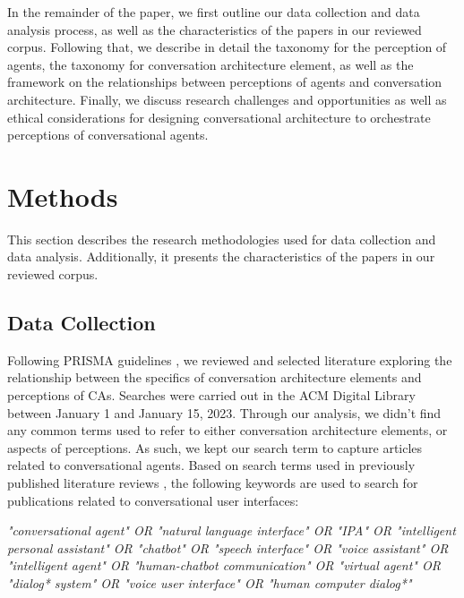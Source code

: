 \documentclass[sigconf,screen,review, anonymous]{acmart}
\begin{document}
In the remainder of the paper, we first outline our data collection and data analysis process, as well as the characteristics of the papers in our reviewed corpus. Following that, we describe in detail the taxonomy for the perception of agents, the taxonomy for conversation architecture element, as well as the framework on the relationships between perceptions of agents and conversation architecture. Finally, we discuss research challenges and opportunities as well as ethical considerations for designing conversational architecture to orchestrate perceptions of conversational agents.





\section{Methods}

This section describes the research methodologies used for data collection and data analysis. Additionally, it presents the characteristics of the papers in our reviewed corpus.

\subsection{Data Collection}

Following PRISMA guidelines \cite{prisma}, we reviewed and selected literature exploring the relationship between the specifics of conversation architecture elements and perceptions of CAs. Searches were carried out in the ACM Digital Library between January 1 and January 15, 2023. Through our analysis, we didn't find any common terms used to refer to either conversation architecture elements, or aspects of perceptions. As such, we kept our search term to capture articles related to conversational agents. Based on search terms used in previously published literature reviews \cite{clark2019state}\cite{rapp2021human}, the following keywords are used to search for publications related to conversational user interfaces:
\newline

\textit{"conversational agent" OR "natural language interface" OR "IPA" OR "intelligent personal assistant" OR "chatbot" OR "speech interface" OR "voice assistant" OR "intelligent agent" OR "human-chatbot communication" OR "virtual agent" OR "dialog* system" OR "voice user interface" OR "human computer dialog*"}
\newline
\end{document}
